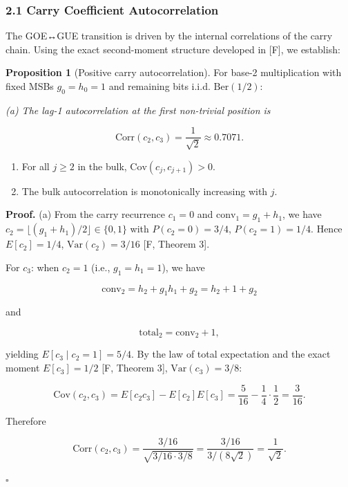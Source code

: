\documentclass[
  11pt,
]{article}
\begin{document}
\subsubsection{2.1 Carry Coefficient
Autocorrelation}\label{carry-coefficient-autocorrelation}

The GOE↔GUE transition is driven by the internal correlations of the carry
chain. Using the exact second-moment structure developed in {[}F{]}, we
establish:

\textbf{Proposition 1} (Positive carry autocorrelation). For base-2
multiplication with fixed MSBs \(g_0 = h_0 = 1\) and remaining bits i.i.d.
\(\mathrm{Ber}(1/2)\):

\emph{(a) The lag-1 autocorrelation at the first non-trivial position is}

\[\mathrm{Corr}(c_2, c_3) = \frac{1}{\sqrt{2}} \approx 0.7071.\]

\begin{enumerate}
\def\labelenumi{(\alph{enumi})}
\setcounter{enumi}{1}
\item
  For all \(j \geq 2\) in the bulk, \(\mathrm{Cov}(c_j, c_{j+1}) > 0\).
\item
  The bulk autocorrelation is monotonically increasing with \(j\).
\end{enumerate}

\textbf{Proof.} (a) From the carry recurrence \(c_1 = 0\) and
\(\mathrm{conv}_1 = g_1 + h_1\), we have
\(c_2 = \lfloor(g_1 + h_1)/2\rfloor \in \lbrace{}0,1\rbrace{}\) with
\(P(c_2 = 0) = 3/4\), \(P(c_2 = 1) = 1/4\). Hence \(E[c_2] = 1/4\),
\(\mathrm{Var}(c_2) = 3/16\) {[}F, Theorem 3{]}.

For \(c_3\): when \(c_2 = 1\) (i.e., \(g_1 = h_1 = 1\)), we have

\[\mathrm{conv}_2 = h_2 + g_1 h_1 + g_2 = h_2 + 1 + g_2\]

and

\[\mathrm{total}_2 = \mathrm{conv}_2 + 1,\]

yielding \(E[c_3 \mid c_2 = 1] = 5/4\). By the law of total expectation and the
exact moment \(E[c_3] = 1/2\) {[}F, Theorem 3{]}, \(\mathrm{Var}(c_3) = 3/8\):

\[\mathrm{Cov}(c_2, c_3) = E[c_2 c_3] - E[c_2]E[c_3] = \frac{5}{16} - \frac{1}{4}\cdot\frac{1}{2} = \frac{3}{16}.\]

Therefore

\[\mathrm{Corr}(c_2, c_3) = \frac{3/16}{\sqrt{3/16 \cdot 3/8}} = \frac{3/16}{3/(8\sqrt{2})} = \frac{1}{\sqrt{2}}.\]

\(\square\)
\end{document}
